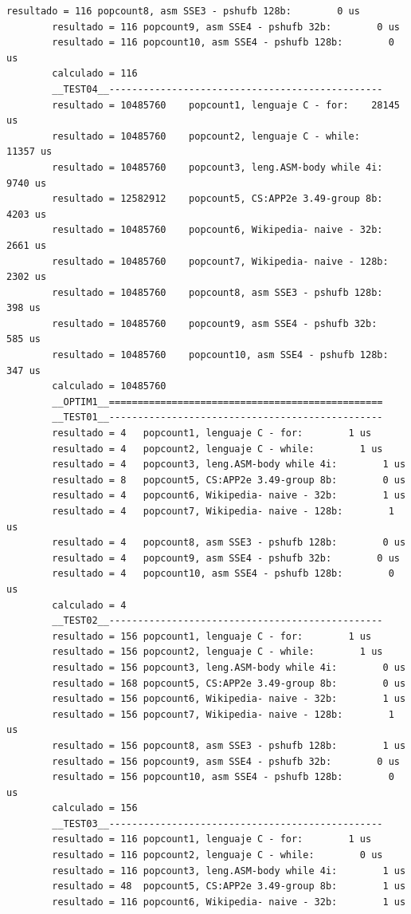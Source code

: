\begin{lstlisting}[frame=single]
		resultado = 116	popcount8, asm SSE3 - pshufb 128b:        0 us
		resultado = 116	popcount9, asm SSE4 - pshufb 32b:        0 us
		resultado = 116	popcount10, asm SSE4 - pshufb 128b:        0 us
		calculado = 116
		__TEST04__------------------------------------------------
		resultado = 10485760	popcount1, lenguaje C - for:    28145 us
		resultado = 10485760	popcount2, lenguaje C - while:    11357 us
		resultado = 10485760	popcount3, leng.ASM-body while 4i:     9740 us
		resultado = 12582912	popcount5, CS:APP2e 3.49-group 8b:     4203 us
		resultado = 10485760	popcount6, Wikipedia- naive - 32b:     2661 us
		resultado = 10485760	popcount7, Wikipedia- naive - 128b:     2302 us
		resultado = 10485760	popcount8, asm SSE3 - pshufb 128b:      398 us
		resultado = 10485760	popcount9, asm SSE4 - pshufb 32b:      585 us
		resultado = 10485760	popcount10, asm SSE4 - pshufb 128b:      347 us
		calculado = 10485760
		__OPTIM1__================================================
		__TEST01__------------------------------------------------
		resultado = 4	popcount1, lenguaje C - for:        1 us
		resultado = 4	popcount2, lenguaje C - while:        1 us
		resultado = 4	popcount3, leng.ASM-body while 4i:        1 us
		resultado = 8	popcount5, CS:APP2e 3.49-group 8b:        0 us
		resultado = 4	popcount6, Wikipedia- naive - 32b:        1 us
		resultado = 4	popcount7, Wikipedia- naive - 128b:        1 us
		resultado = 4	popcount8, asm SSE3 - pshufb 128b:        0 us
		resultado = 4	popcount9, asm SSE4 - pshufb 32b:        0 us
		resultado = 4	popcount10, asm SSE4 - pshufb 128b:        0 us
		calculado = 4
		__TEST02__------------------------------------------------
		resultado = 156	popcount1, lenguaje C - for:        1 us
		resultado = 156	popcount2, lenguaje C - while:        1 us
		resultado = 156	popcount3, leng.ASM-body while 4i:        0 us
		resultado = 168	popcount5, CS:APP2e 3.49-group 8b:        0 us
		resultado = 156	popcount6, Wikipedia- naive - 32b:        1 us
		resultado = 156	popcount7, Wikipedia- naive - 128b:        1 us
		resultado = 156	popcount8, asm SSE3 - pshufb 128b:        1 us
		resultado = 156	popcount9, asm SSE4 - pshufb 32b:        0 us
		resultado = 156	popcount10, asm SSE4 - pshufb 128b:        0 us
		calculado = 156
		__TEST03__------------------------------------------------
		resultado = 116	popcount1, lenguaje C - for:        1 us
		resultado = 116	popcount2, lenguaje C - while:        0 us
		resultado = 116	popcount3, leng.ASM-body while 4i:        1 us
		resultado = 48	popcount5, CS:APP2e 3.49-group 8b:        1 us
		resultado = 116	popcount6, Wikipedia- naive - 32b:        1 us

\end{lstlisting}
